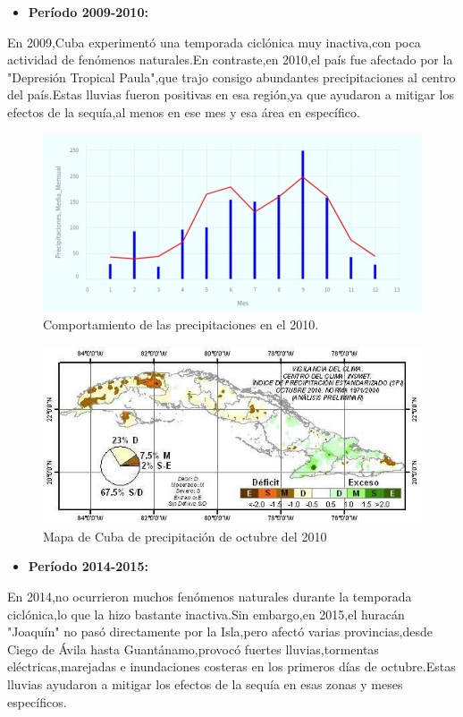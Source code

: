 \documentclass[12pt]{article}
\begin{document}
\begin{itemize}
	\item\textbf{Período 2009-2010:}
\end{itemize}


En 2009,Cuba experimentó una temporada ciclónica muy inactiva,con poca actividad de fenómenos naturales.En contraste,en 2010,el país fue afectado por la "Depresión Tropical Paula",que trajo consigo abundantes precipitaciones al centro del país.Estas lluvias fueron positivas en esa región,ya que ayudaron a mitigar los efectos de la sequía,al menos en ese mes y esa área en específico.\cite{webpage6}\cite{webpage7}

\begin{figure}[H]
	\centering
	\includegraphics[width=0.6\linewidth]{./Report/images/precipitaciones_2010}
	\caption{Comportamiento de las precipitaciones en el 2010.}
	\label{fig:precipitaciones2010}
\end{figure}


\begin{figure}[H]
	\centering
	\includegraphics[width=0.7\linewidth]{./Report/images/mapa}
	\caption{Mapa de Cuba de precipitación de octubre del 2010}
	\label{fig:mapa}
\end{figure}

\begin{itemize}
	\item \textbf{Período 2014-2015:}
\end{itemize}


En 2014,no ocurrieron muchos fenómenos naturales durante la temporada ciclónica,lo que la hizo bastante inactiva.Sin embargo,en 2015,el huracán "Joaquín" no pasó directamente por la Isla,pero afectó varias provincias,desde Ciego de Ávila hasta Guantánamo,provocó fuertes lluvias,tormentas eléctricas,marejadas e inundaciones costeras en los primeros días de octubre.Estas lluvias ayudaron a mitigar los efectos de la sequía en esas zonas y meses específicos.\cite{webpage6}\cite{webpage8}
\end{document}
